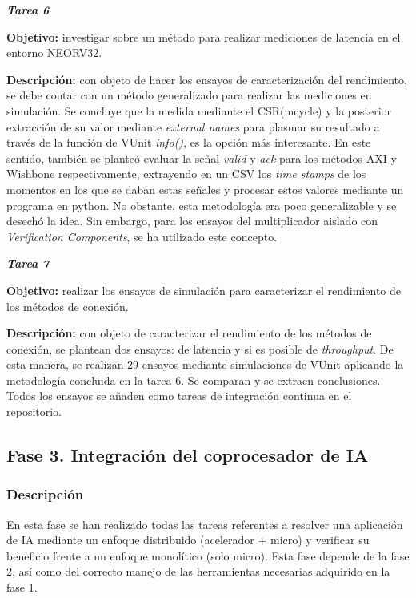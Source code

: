 \noindent \textbf{\textit{Tarea 6}}

\textbf{Objetivo:} investigar sobre un método para realizar mediciones de latencia en el entorno NEORV32. 

\textbf{Descripción:} con objeto de hacer los ensayos de caracterización del rendimiento, se debe contar con un método generalizado para realizar las mediciones en simulación.
Se concluye que la medida mediante el CSR(mcycle) y la posterior extracción de su valor mediante \textit{external names} para plasmar su resultado a través de la función de VUnit \textit{info()}, es la opción más interesante.
En este sentido, también se planteó evaluar la señal \textit{valid} y \textit{ack} para los métodos AXI y Wishbone respectivamente, extrayendo en un CSV los \textit{time stamps} de los momentos en los que se daban estas señales y procesar estos valores mediante un programa en python.
No obstante, esta metodología era poco generalizable y se desechó la idea.
Sin embargo, para los ensayos del multiplicador aislado con \textit{Verification Components}, se ha utilizado este concepto.

\noindent \textbf{\textit{Tarea 7}}

\textbf{Objetivo:} realizar los ensayos de simulación para caracterizar el rendimiento de los métodos de conexión. 

\textbf{Descripción:} con objeto de caracterizar el rendimiento de los métodos de conexión, se plantean dos ensayos: de latencia y si es posible de \textit{throughput}.
De esta manera, se realizan 29 ensayos mediante simulaciones de VUnit aplicando la metodología concluida en la tarea 6.
Se comparan y se extraen conclusiones.
Todos los ensayos se añaden como tareas de integración continua en el repositorio.

\subsection{Fase 3. Integración del coprocesador de IA}

\subsubsection{Descripción}

En esta fase se han realizado todas las tareas referentes a resolver una aplicación de IA mediante un enfoque distribuido (acelerador + micro) y verificar su beneficio frente a un enfoque monolítico (solo micro).
Esta fase depende de la fase 2, así como del correcto manejo de las herramientas necesarias adquirido en la fase 1.

